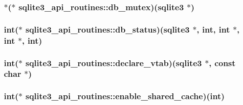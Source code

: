 \hypertarget{structsqlite3__api__routines_a3b6e71fa5b3a8b01af308189d68a6f88}{
\subsubsection[{db\-\_\-mutex}]{$\ast$($\ast$ sqlite3\-\_\-api\-\_\-routines\-::db\-\_\-mutex)({\bf sqlite3} $\ast$)}}\label{structsqlite3__api__routines_a3b6e71fa5b3a8b01af308189d68a6f88}
\hypertarget{structsqlite3__api__routines_ac3ea73ff30ee0c21446f94a643581280}{
\subsubsection[{db\-\_\-status}]{\setlength{\rightskip}{0pt plus 5cm}int($\ast$ sqlite3\-\_\-api\-\_\-routines\-::db\-\_\-status)({\bf sqlite3} $\ast$, int, int $\ast$, int $\ast$, int)}}\label{structsqlite3__api__routines_ac3ea73ff30ee0c21446f94a643581280}
\hypertarget{structsqlite3__api__routines_a6b6035b36ea9d0800181e69e20059b32}{
\subsubsection[{declare\-\_\-vtab}]{\setlength{\rightskip}{0pt plus 5cm}int($\ast$ sqlite3\-\_\-api\-\_\-routines\-::declare\-\_\-vtab)({\bf sqlite3} $\ast$, const char $\ast$)}}\label{structsqlite3__api__routines_a6b6035b36ea9d0800181e69e20059b32}
\hypertarget{structsqlite3__api__routines_a3e6b7bbdd68cde43ef4afffd73e957ea}{
\subsubsection[{enable\-\_\-shared\-\_\-cache}]{\setlength{\rightskip}{0pt plus 5cm}int($\ast$ sqlite3\-\_\-api\-\_\-routines\-::enable\-\_\-shared\-\_\-cache)(int)}}\label{structsqlite3__api__routines_a3e6b7bbdd68cde43ef4afffd73e957ea}
